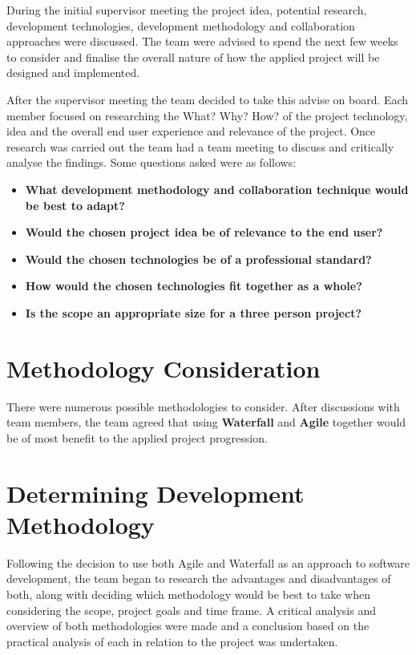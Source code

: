During the initial supervisor meeting the project idea, potential research, development technologies, development methodology and collaboration approaches were discussed. The team were advised to spend the next few weeks to consider and finalise the overall nature of how the applied project will be designed and implemented.

\vspace{5mm} %

After the supervisor meeting the team decided to take this advise on board. Each member focused on researching the What? Why? How? of the project technology, idea and the overall end user experience and relevance of the project. Once research was carried out the team had a team meeting to discuss and critically analyse the findings. Some questions asked were as follows:

\begin{itemize}

    \item \textbf{What development methodology and collaboration technique would be best to adapt?}
    
    \item \textbf{Would the chosen project idea be of relevance to the end user?}
    
     \item \textbf{Would the chosen technologies be of a professional standard?}
    
    \item \textbf{How would the chosen technologies fit together as a whole?}
    
    \item \textbf{Is the scope an appropriate size for a three person project?}
    
\end{itemize}

\section{Methodology Consideration}
There were numerous possible methodologies to consider. After discussions with team members, the team agreed that using \textbf{Waterfall} and \textbf{Agile} together would be of most benefit to the applied project progression. 


\vspace{70mm} %


\section{Determining Development Methodology}
Following the decision to use both Agile and Waterfall as an approach to software development, the team began to research the advantages and disadvantages of both, along with deciding which methodology would be best to take when considering the scope, project goals and time frame. A critical analysis and overview of both methodologies were made and a conclusion based on the practical analysis of each in relation to the project was undertaken.

